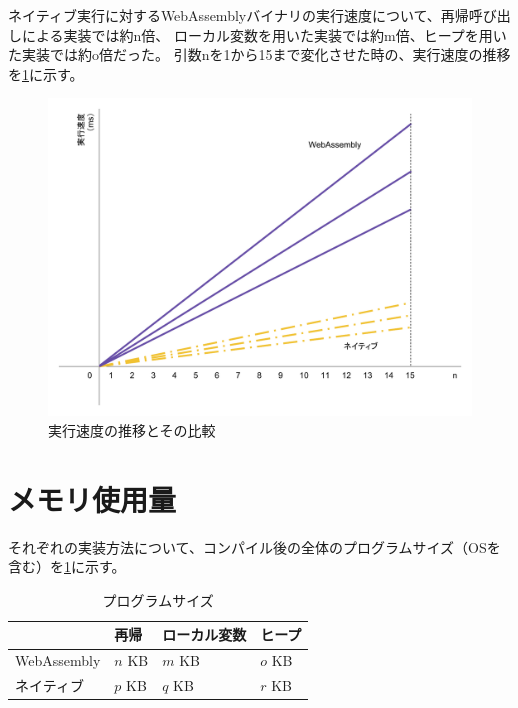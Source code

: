 ネイティブ実行に対するWebAssemblyバイナリの実行速度について、再帰呼び出しによる実装では約n倍、
ローカル変数を用いた実装では約m倍、ヒープを用いた実装では約o倍だった。
引数nを1から15まで変化させた時の、実行速度の推移を\ref{fig:exec_time}に示す。

\begin{figure}[htbp]
  \caption{実行速度の推移とその比較}
  \label{fig:exec_time}
  \begin{center}
    \includegraphics[bb=0 0 800 600,width=12cm]{img/exec_time.pdf}
  \end{center}
\end{figure}

\section{メモリ使用量}

それぞれの実装方法について、コンパイル後の全体のプログラムサイズ（OSを含む）を\ref{tb:program_size}に示す。

\begin{table}[]
  \caption{プログラムサイズ}
  \label{tb:program_size}
  \begin{center}
    \begin{tabular}{|l|l|l|l|}
      \hline
      & 再帰 & ローカル変数 & ヒープ \\ \hline
      WebAssembly & $n$ KB & $m$ KB & $o$ KB \\ \hline
      ネイティブ & $p$ KB & $q$ KB & $r$ KB \\ \hline
    \end{tabular}
  \end{center}
\end{table}

